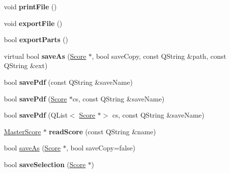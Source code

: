 \begin{DoxyCompactItemize}
void {\bfseries print\+File} ()
\item 
\mbox{\label{class_ms_1_1_muse_score_adadb7c443605afb5ff13f1a30e32547c}} 
void {\bfseries export\+File} ()
\item 
\mbox{\label{class_ms_1_1_muse_score_a68988824dcb5415d891f5b2000a50550}} 
bool {\bfseries export\+Parts} ()
\item 
\mbox{\label{class_ms_1_1_muse_score_a18d65a667e98cf1434b4374f2f7679fb}} 
virtual bool {\bfseries save\+As} (\hyperlink{class_ms_1_1_score}{Score} $\ast$, bool save\+Copy, const Q\+String \&path, const Q\+String \&ext)
\item 
\mbox{\label{class_ms_1_1_muse_score_a3115e4838c9879d10b186b55bfb0324f}} 
bool {\bfseries save\+Pdf} (const Q\+String \&save\+Name)
\item 
\mbox{\label{class_ms_1_1_muse_score_adc00e59f63e4fe24deb7494e98e0170e}} 
bool {\bfseries save\+Pdf} (\hyperlink{class_ms_1_1_score}{Score} $\ast$cs, const Q\+String \&save\+Name)
\item 
\mbox{\label{class_ms_1_1_muse_score_a48118bb525db1ea1162a2e7de6e18e0f}} 
bool {\bfseries save\+Pdf} (Q\+List$<$ \hyperlink{class_ms_1_1_score}{Score} $\ast$$>$ cs, const Q\+String \&save\+Name)
\item 
\mbox{\label{class_ms_1_1_muse_score_ac84f90a6474f00a1eaeae5bf19ecf495}} 
\hyperlink{class_ms_1_1_master_score}{Master\+Score} $\ast$ {\bfseries read\+Score} (const Q\+String \&name)
\item 
bool \hyperlink{class_ms_1_1_muse_score_a5e7076e8a4bf0ae711dd25ba29283061}{save\+As} (\hyperlink{class_ms_1_1_score}{Score} $\ast$, bool save\+Copy=false)
\item 
\mbox{\label{class_ms_1_1_muse_score_aa5fee67b424fb730f63a34051ef80299}} 
bool {\bfseries save\+Selection} (\hyperlink{class_ms_1_1_score}{Score} $\ast$)
\item 
\mbox{\label{class_ms_1_1_muse_score_adede07f8732d3ed5ed79910eb7a2eb86}} 
$$
\end{DoxyCompactItemize}
